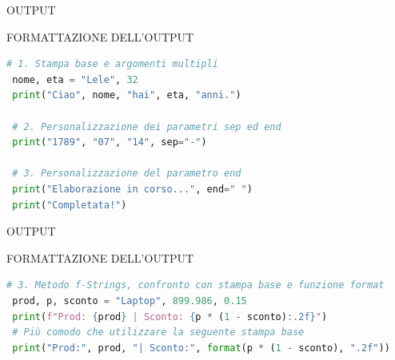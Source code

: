 \documentclass[aspectratio=1610]{beamer}
\begin{document}
\begin{frame}[fragile]{OUTPUT}
    \begin{alertblock}{FORMATTAZIONE DELL'OUTPUT}
        \begin{minipage}{0.98\linewidth}
\begin{lstlisting}[language=Python]
 # 1. Stampa base e argomenti multipli
 nome, eta = "Lele", 32
 print("Ciao", nome, "hai", eta, "anni.")

 # 2. Personalizzazione dei parametri sep ed end
 print("1789", "07", "14", sep="-")

 # 3. Personalizzazione del parametro end
 print("Elaborazione in corso...", end=" ")
 print("Completata!")
\end{lstlisting}
        \end{minipage}
    \end{alertblock}
\end{frame}

\begin{frame}[fragile]{OUTPUT}
    \begin{alertblock}{FORMATTAZIONE DELL'OUTPUT}
        \begin{minipage}{0.98\linewidth}
\begin{lstlisting}[language=Python]
 # 3. Metodo f-Strings, confronto con stampa base e funzione format
 prod, p, sconto = "Laptop", 899.986, 0.15
 print(f"Prod: {prod} | Sconto: {p * (1 - sconto):.2f}")
 # Più comodo che utilizzare la seguente stampa base
 print("Prod:", prod, "| Sconto:", format(p * (1 - sconto), ".2f"))
\end{lstlisting}
        \end{minipage}
    \end{alertblock}
\end{frame}
\end{document}
